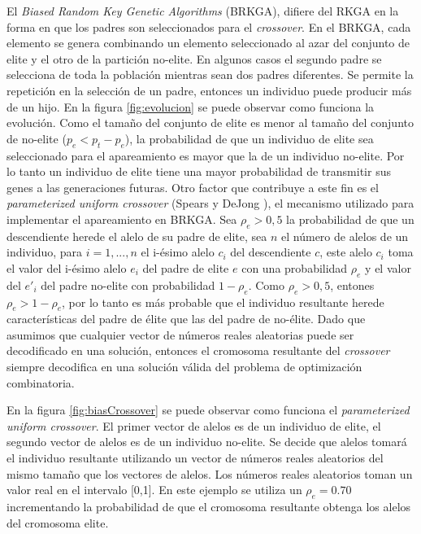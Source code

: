 El \textit{Biased Random Key Genetic Algorithms} (BRKGA), difiere del RKGA en la forma en que los padres son seleccionados para el \textit{crossover}. En el BRKGA, cada elemento se genera combinando un elemento seleccionado al azar del conjunto de elite y el otro de la partición no-elite. En algunos casos el segundo padre se selecciona de toda la población mientras sean dos padres diferentes. Se permite la repetición en la selección de un padre, entonces un individuo puede producir más de un hijo. En la figura \ref{fig:evolucion} se puede observar como funciona la evolución. Como el tamaño del conjunto de elite es menor al tamaño del conjunto de no-elite ($p_e < p_t - p_e$), la probabilidad de que un individuo de elite sea seleccionado para el apareamiento es mayor que la de un individuo no-elite. Por lo tanto un individuo de elite tiene una mayor probabilidad de transmitir sus genes a las generaciones futuras. Otro factor que contribuye a este fin es el \textit{parameterized uniform crossover} (Spears y DeJong \cite{SpearsDeJong}), el mecanismo utilizado para implementar el apareamiento en BRKGA. Sea $\rho_e > 0,5$ la probabilidad de que un descendiente herede el alelo de su padre de elite, sea $n$ el número de alelos de un individuo, para $i =1,...,n$ el i-ésimo alelo $c_i$ del descendiente $c$, este alelo $c_i$ toma el valor del i-ésimo alelo $e_i$ del padre de elite $e$ con una probabilidad $\rho_e$ y el valor del $e'_i$ del padre no-elite con probabilidad $1-\rho_e$. Como $\rho_e > 0,5$, entones $\rho_e > 1 - \rho_e$, por lo tanto es más probable que el individuo resultante herede características del padre de élite que las del padre de no-élite. Dado que asumimos que cualquier vector de números reales aleatorias puede ser decodificado en una solución, entonces el cromosoma resultante del \textit{crossover} siempre decodifica en una solución válida del problema de optimización combinatoria. 

\bigskip

En la figura \ref{fig:biasCrossover} se puede observar como funciona el \textit{parameterized uniform crossover}. El primer vector de alelos es de un individuo de elite, el segundo vector de alelos es de un individuo no-elite. Se decide que alelos tomará el individuo resultante utilizando un vector de números reales aleatorios del mismo tamaño que los vectores de alelos. Los números reales aleatorios toman un valor real en el intervalo [0,1]. En este ejemplo se utiliza un $\rho_e = 0.70$ incrementando la probabilidad de que el cromosoma resultante obtenga los alelos del cromosoma elite.


